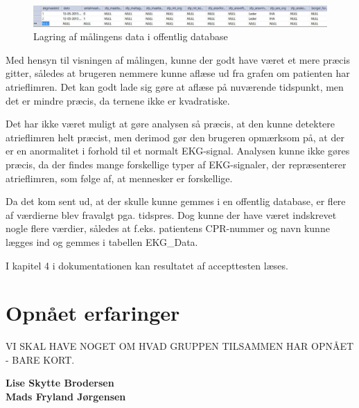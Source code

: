 \begin{figure}[H]
	\centering
	\includegraphics[width=1\textwidth]{Figurer/Snip20150525_29}
	\caption{Lagring af målingens data i offentlig database}
\end{figure}

Med hensyn til visningen af målingen, kunne der godt have været et mere præcis gitter, således at brugeren nemmere kunne aflæse ud fra grafen om patienten har atrieflimren. Det kan godt lade sig gøre at aflæse på nuværende tidspunkt, men det er mindre præcis, da ternene ikke er kvadratiske.

Det har ikke været muligt at gøre analysen så præcis, at den kunne detektere atrieflimren helt præcist, men derimod gør den brugeren opmærksom på, at der er en anormalitet i forhold til et normalt EKG-signal. Analysen kunne ikke gøres præcis, da der findes mange forskellige typer af EKG-signaler, der repræsenterer atrieflimren, som følge af, at mennesker er forskellige.

Da det kom sent ud, at der skulle kunne gemmes i en offentlig database, er flere af værdierne blev fravalgt pga. tidspres. Dog kunne der have været indskrevet nogle flere værdier, således at f.eks. patientens CPR-nummer og navn kunne lægges ind og gemmes i tabellen EKG\_Data.

I kapitel 4 i dokumentationen kan resultatet af accepttesten læses. 


\section{Opnået erfaringer}

VI SKAL HAVE NOGET OM HVAD GRUPPEN TILSAMMEN HAR OPNÅET - BARE KORT. 


\textbf{Lise Skytte Brodersen}\\

\textbf{Mads Fryland Jørgensen}\\

